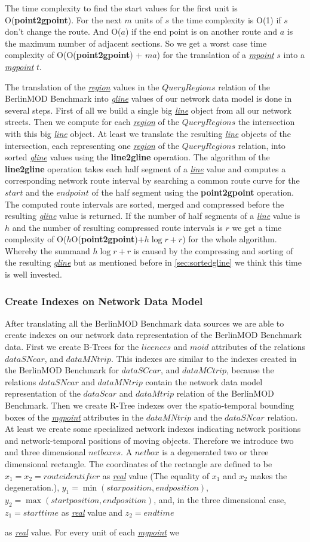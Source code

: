 \documentclass[a4paper]{article}
\newcommand{\bmodb} {BerlinMOD Benchmark}
\newcommand{\op}[1]{\textbf{#1}}
\newcommand{\dt}[1]{\textsl{\underline{#1}}}
\begin{document}
{The time complexity to find the start values for the first unit is O(\op{point2gpoint}).
For the next $m$ units of $s$ the time complexity is O(1) if $s$ don't change the
route. And O($a$) if the end point is on another route and $a$ is the maximum
number of adjacent sections. So we get a worst case time complexity of
O(O(\op{point2gpoint}) + $ma$) for the translation of a \dt{mpoint} $s$ into a
\dt{mgpoint} $t$.

The translation of the \dt{region} values in the $QueryRegions$ relation of the
\bmodb{} into \dt{gline} values of our network data model is done in several steps.
First of all we build a single big \dt{line} object from all our network streets.
Then we compute for each \dt{region} of the $QueryRegions$ the intersection with
this big \dt{line} object. At least we translate the resulting \dt{line} objects
of the intersection, each representing one \dt{region} of the $QueryRegions$
relation, into sorted \dt{gline} values using the \op{line2gline} operation.
The algorithm of the \op{line2gline} operation takes each half segment of a
\dt{line} value and computes a corresponding network route interval by
searching a common route curve for the $start$ and the $end point$ of the
half segment using the \op{point2gpoint} operation. The computed
route intervals are sorted, merged and compressed before the resulting
\dt{gline} value is returned. If the number of half segments of a \dt{line}
value is $h$ and the number of resulting compressed route intervals is $r$
we get a time complexity of O($h$O(\op{point2gpoint})$+ h \log r + r$) for the
whole algorithm. Whereby the summand $h \log r + r$ is caused by the compressing
and sorting of the resulting \dt{gline} but as mentioned before
in \ref{sec:sortedgline} we think this time is well invested.
\subsubsection{Create Indexes on Network Data Model}
\label{sec:createIndex}
After translating all the \bmodb{} data sources we are able to create indexes on
our network data representation of the \bmodb{} data. First we create B-Trees
for the $licences$ and $moid$ attributes of the relations $dataSNcar$, and $dataMNtrip$.
This indexes are similar to the indexes created in the \bmodb{} for $dataSCcar$,
and $dataMCtrip$, because the relations $dataSNcar$ and $dataMNtrip$ contain
the network data model representation of the $dataScar$ and $dataMtrip$ relation
of the \bmodb{}. Then we create R-Tree indexes over the spatio-temporal bounding
boxes of the \dt{mgpoint} attributes in the $dataMNtrip$ and the $dataSNcar$ relation.
At least we create some specialized network indexes indicating network positions
and network-temporal positions of moving objects. Therefore we introduce two and
three dimensional $netboxes$. A $netbox$ is a degenerated two or three
dimensional rectangle. The coordinates of the rectangle are defined to be
$x_1 = x_2 = route identifier$ as \dt{real} value (The equality of $x_1$ and
$x_2$ makes the degeneration.), $y_1 = \min (star position, end position)$,
$y_2 = \max (start position, end position)$,
and, in the three dimensional case, $z_1 = starttime$ as \dt{real} value and
$z_2 = endtime$} as \dt{real} value.  For every unit of each \dt{mgpoint} we
\end{document}
